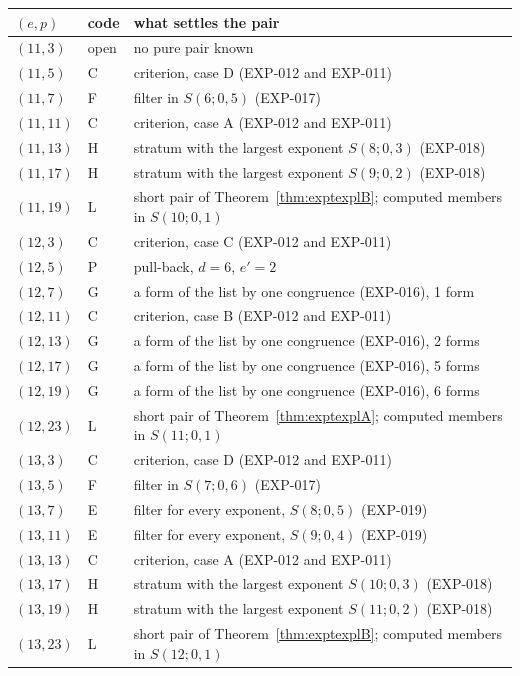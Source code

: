 \begin{tabular}{@{}ll>{\raggedright\arraybackslash}p{9.8cm}@{}}
\toprule
$(e,p)$ & code & what settles the pair\\
\midrule
$(11,3)$ & open & no pure pair known\\
$(11,5)$ & C & criterion, case D (EXP-012 and EXP-011)\\
$(11,7)$ & F & filter in $S(6;0,5)$ (EXP-017)\\
$(11,11)$ & C & criterion, case A (EXP-012 and EXP-011)\\
$(11,13)$ & H & stratum with the largest exponent $S(8;0,3)$ (EXP-018)\\
$(11,17)$ & H & stratum with the largest exponent $S(9;0,2)$ (EXP-018)\\
$(11,19)$ & L & short pair of Theorem~\ref{thm:exptexplB}; computed members in $S(10;0,1)$\\
$(12,3)$ & C & criterion, case C (EXP-012 and EXP-011)\\
$(12,5)$ & P & pull-back, $d=6$, $e'=2$\\
$(12,7)$ & G & a form of the list by one congruence (EXP-016), 1 form\\
$(12,11)$ & C & criterion, case B (EXP-012 and EXP-011)\\
$(12,13)$ & G & a form of the list by one congruence (EXP-016), 2 forms\\
$(12,17)$ & G & a form of the list by one congruence (EXP-016), 5 forms\\
$(12,19)$ & G & a form of the list by one congruence (EXP-016), 6 forms\\
$(12,23)$ & L & short pair of Theorem~\ref{thm:exptexplA}; computed members in $S(11;0,1)$\\
$(13,3)$ & C & criterion, case D (EXP-012 and EXP-011)\\
$(13,5)$ & F & filter in $S(7;0,6)$ (EXP-017)\\
$(13,7)$ & E & filter for every exponent, $S(8;0,5)$ (EXP-019)\\
$(13,11)$ & E & filter for every exponent, $S(9;0,4)$ (EXP-019)\\
$(13,13)$ & C & criterion, case A (EXP-012 and EXP-011)\\
$(13,17)$ & H & stratum with the largest exponent $S(10;0,3)$ (EXP-018)\\
$(13,19)$ & H & stratum with the largest exponent $S(11;0,2)$ (EXP-018)\\
$(13,23)$ & L & short pair of Theorem~\ref{thm:exptexplB}; computed members in $S(12;0,1)$\\

\end{tabular}
